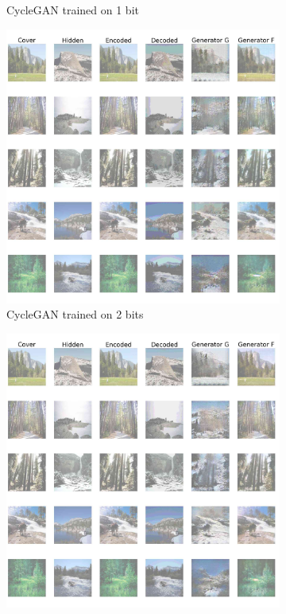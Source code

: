 \documentclass[conference]{IEEEtran}
\begin{document}
\begin{figure}[!hbt]
\begin{subfigure}[b]{0.28\textwidth}
            \caption{CycleGAN trained on 1 bit}
            \label{cycle_gan_1}
    \end{subfigure}
    \hspace{0.05\textwidth}
    \begin{subfigure}[b]{0.28\textwidth}
    \centering
            \includegraphics[scale=0.08]{images/cycle_sten_2.jpg}
            \caption{CycleGAN trained on 2 bits}
            \label{cycle_gan_2}
    \end{subfigure}
    \hspace{0.05\textwidth}
    \begin{subfigure}[b]{0.28\textwidth}
    \centering
            \includegraphics[scale=0.08]{images/cycle_sten_3.jpg}

\end{subfigure}
\end{figure}
\end{document}
